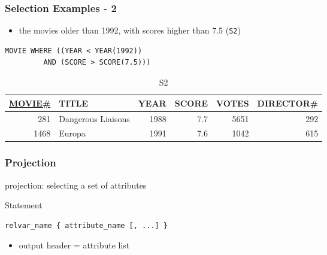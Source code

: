 \documentclass[dvipsnames]{beamer}
\theoremstyle{plain}
\begin{document}
\begin{frame}[fragile]
  \frametitle{Selection Examples - 2}

  \begin{example}
    \begin{itemize}
      \item the movies older than 1992, with scores higher than 7.5
        (\texttt{S2})
    \end{itemize}

    \begin{lstlisting}
MOVIE WHERE ((YEAR < YEAR(1992))
         AND (SCORE > SCORE(7.5)))
    \end{lstlisting}

    \pause
    \vspace{-10pt}
    \begin{tiny}
    \begin{table}
      \caption{S2}
      \begin{tabular}{|r|l|r|r|r|r|}\hline
\underline{MOVIE\#} & TITLE & YEAR & SCORE & VOTES & DIRECTOR\#\\[2pt]\hline\hline
   281 & Dangerous Liaisons & 1988 &   7.7 &  5651 &        292\\\hline
  1468 & Europa             & 1991 &   7.6 &  1042 &        615\\\hline
      \end{tabular}
    \end{table}
    \end{tiny}
  \end{example}
\end{frame}

\begin{frame}[fragile]
  \frametitle{Projection}

  \begin{definition}
    \alert{projection}: selecting a set of attributes
  \end{definition}

  \pause
  \begin{block}{Statement}
    \begin{lstlisting}
relvar_name { attribute_name [, ...] }
    \end{lstlisting}
  \end{block}

  \pause
  \begin{itemize}
    \item output header = attribute list
  \end{itemize}
\end{frame}
\end{document}
